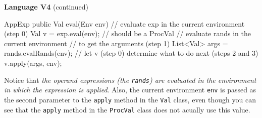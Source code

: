 \begin{minipage}[t]{\sw}
\slidenumber
\LARGE
{\bf Language V4} (continued)\exx
\Large
\emm{}
\Large
\begin{qv}
AppExp
    public Val eval(Env env) {
        // evaluate exp in the current environment (step 0)
        Val v = exp.eval(env); // should be a ProcVal
        // evaluate rands in the current environment
        // to get the arguments (step 1)
        List<Val> args = rands.evalRands(env);
        // let v (step 0) determine what to do next (steps 2 and 3)
        v.apply(args, env);
    }
\end{qv}
\LARGE
Notice that {\em the operand expressions (the \verb'rands')
are evaluated in the environment in which the expression is applied}.
Also, the current environment \verb'env' is passed as the second parameter
to the \verb'apply' method in the \verb'Val' class, 
even though you can see that the \verb'apply' method
in the \verb'ProcVal' class does not acually use this value.\exx
\end{minipage}
